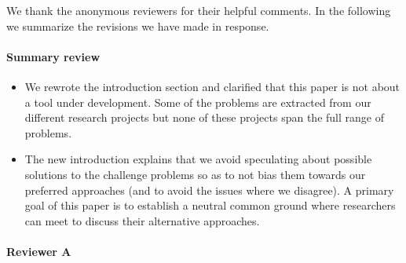 \documentclass{article}
\begin{document}
We thank the anonymous reviewers for their helpful comments. In the following we summarize the revisions we have made in response.

\paragraph{Summary review}{}

\begin{itemize}
\item We rewrote the introduction section and clarified that this paper is not about a tool under development. Some of the problems are extracted from our different research projects but none of these projects span the full range of problems.

\item The new introduction explains that we avoid speculating about possible solutions to the challenge problems so as to not bias them towards our preferred approaches (and to avoid the issues where we disagree). A primary goal of this paper is to establish a neutral common ground where researchers can meet to discuss their alternative approaches.

\end{itemize}

\paragraph{Reviewer A}{}
\end{document}
